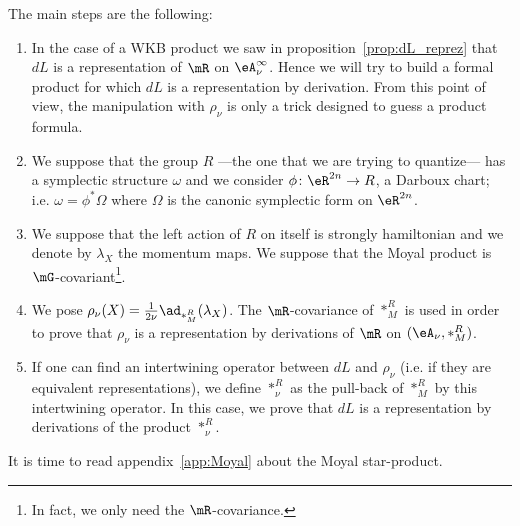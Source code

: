 The main steps are the following:
{\renewcommand{\theenumi}{\arabic{enumi}.}
\begin{enumerate}
\item In the case of a WKB product we saw in proposition~\ref{prop:dL_reprez} that $dL$ is a representation of $\mR$ on $\eA_{\nu}^{\infty}$. Hence we will try to build a formal product for which $dL$ is a representation by derivation. From this point of view, the manipulation with $\rho_{\nu}$ is only a trick designed to guess a product formula.

\item We suppose that the group $R$ ---the one that we are trying to quantize--- has a symplectic structure $\omega$ and we consider $\phi\colon \eR^{2n}\to R$, a Darboux chart; i.e. $\omega=\phi^*\Omega$ where $\Omega$ is the canonic symplectic form on $\eR^{2n}$.

\item We suppose that the left action of $R$ on itself is strongly hamiltonian and we denote by $\lambda_X$ the momentum maps. We suppose that the Moyal product is $\mG$-covariant\footnote{In fact, we only need the $\mR$-covariance.}.

\item We pose $\rho_{\nu}(X)=\frac{1}{ 2\nu }\ad_{\ast_M^R}(\lambda_X)$. The $\mR$-covariance of $\ast_M^R$ is used in order to prove that $\rho_{\nu}$ is a  representation by derivations of $\mR$ on $(\eA_{\nu},\ast_M^R)$.
\item If one can find an intertwining operator between $dL$ and $\rho_{\nu}$ (i.e. if they are equivalent representations), we define $\ast_{\nu}^R$ as the pull-back of $\ast_M^R$ by this intertwining operator. In this case, we prove that $dL$ is a representation by derivations of the product $\ast_{\nu}^R$.
\end{enumerate}

}       %
    It is time to read appendix~\ref{app:Moyal} about the Moyal star-product.

